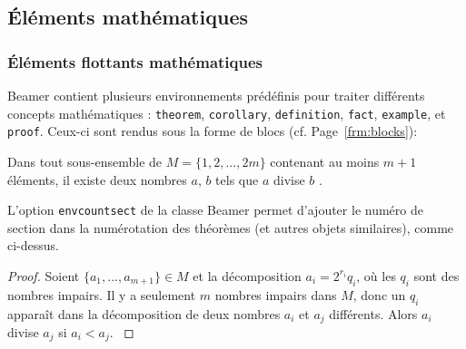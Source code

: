 \documentclass[10pt,    %
    french,             %
    xcolor=table,       %
    envcountsect,       %
    aspectratio=43      %
]{beamer}
\begin{document}
\subsection{Éléments mathématiques}
\begin{frame}
    \frametitle{Éléments flottants mathématiques}
    \small
    
    Beamer contient plusieurs environnements prédéfinis pour traiter différents concepts mathématiques : \texttt{theorem}, \texttt{corollary}, \texttt{definition}, \texttt{fact}, \texttt{example}, et \texttt{proof}. Ceux-ci sont rendus sous la forme de blocs (cf. Page~\ref{frm:blocks}):
    
    \begin{theorem}
        Dans tout sous-ensemble de $M = \{1, 2, ... , 2m\}$ contenant au moins $m + 1$ éléments, il existe deux nombres $a$, $b$ tels que $a$ divise $b$ \cite{Neunhauserer2013}.
        \label{th:theorem}
    \end{theorem} 
    
    L'option \texttt{envcountsect} de la classe Beamer permet d'ajouter le numéro de section dans la numérotation des théorèmes (et autres objets similaires), comme ci-dessus.
    
    \begin{proof}
         Soient $\{a_1, . . . , a_{m+1}\} \in M$ et la décomposition $a_i = 2^{r_i} q_i$, où les $q_i$ sont des nombres impairs. Il y a seulement $m$ nombres impairs dans $M$, donc un $q_i$ apparaît dans la décomposition de deux nombres $a_i$ et $a_j$ différents. Alors $a_i$ divise $a_j$ si $a_i < a_j$.
        \label{th:proof}
    \end{proof} 
\end{frame}
    




\end{document}
